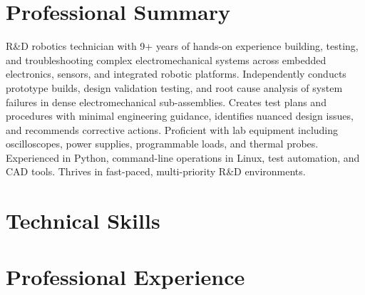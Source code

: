 \documentclass[letterpaper,11pt]{moderncv}
\begin{document}
\makecvtitle
\vspace{-3em}

\section{Professional Summary}
R\&D robotics technician with 9+ years of hands-on experience building, testing, and troubleshooting complex electromechanical systems across embedded electronics, sensors, and integrated robotic platforms. Independently conducts prototype builds, design validation testing, and root cause analysis of system failures in dense electromechanical sub-assemblies. Creates test plans and procedures with minimal engineering guidance, identifies nuanced design issues, and recommends corrective actions. Proficient with lab equipment including oscilloscopes, power supplies, programmable loads, and thermal probes. Experienced in Python, command-line operations in Linux, test automation, and CAD tools. Thrives in fast-paced, multi-priority R\&D environments.

\section{Technical Skills}
\begin{minipage}[t]{0.48\textwidth}
\end{minipage}%
\hfill
\begin{minipage}[t]{0.48\textwidth}
\end{minipage}

\section{Professional Experience}
\end{document}

